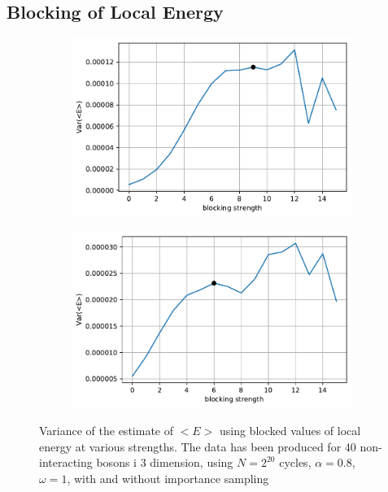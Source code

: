 \subsection{Blocking of Local Energy}
\begin{figure}
	\begin{subfigure}{\textwidth}
		\centering
		\includegraphics[width=.8\linewidth]{figures/blocking1.pdf}
	\end{subfigure}%
	\begin{subfigure}{\textwidth}
		\centering
		\includegraphics[width=.8\linewidth]{figures/blocking2.pdf}
	\end{subfigure}%
	\centering
	\caption{Variance of the estimate of $<E>$ using blocked values of local energy at various strengths. The data has been produced for 40 non-interacting bosons i 3 dimension, using $N = 2^{20}$ cycles, $\alpha = 0.8$, $\omega = 1$, with and without importance sampling}
	\label{fig:blocking1}
\end{figure}

